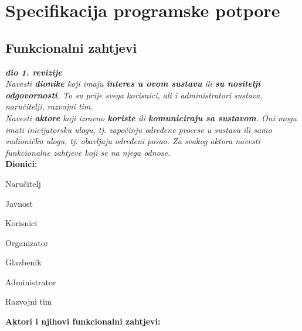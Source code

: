\chapter{Specifikacija programske potpore}
		
	\section{Funkcionalni zahtjevi}
			
		\textbf{\textit{dio 1. revizije}}\\
		
		\textit{Navesti \textbf{dionike} koji imaju \textbf{interes u ovom sustavu} ili  \textbf{su nositelji odgovornosti}. To su prije svega korisnici, ali i administratori sustava, naručitelji, razvojni tim.}\\
			
		\textit{Navesti \textbf{aktore} koji izravno \textbf{koriste} ili \textbf{komuniciraju sa sustavom}. Oni mogu imati inicijatorsku ulogu, tj. započinju određene procese u sustavu ili samo sudioničku ulogu, tj. obavljaju određeni posao. Za svakog aktora navesti funkcionalne zahtjeve koji se na njega odnose.}\\
		
		
		\noindent \textbf{Dionici:}
		
    		\begin{packed_enum}
    			\item Naručitelj
    			\item Javnost
    			\item Korisnici
    			\item Organizator
    			\item Glazbenik 							
    			\item Administrator
    			\item Razvojni tim
    		\end{packed_enum}
		
		\noindent \textbf{Aktori i njihovi funkcionalni zahtjevi:}
		
